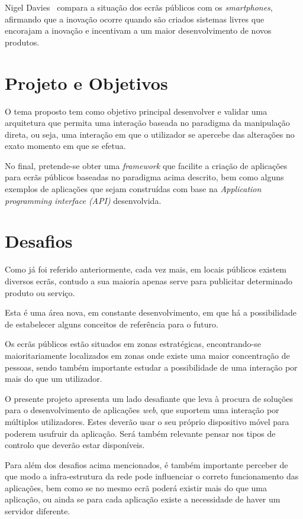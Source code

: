 Nigel Davies~\cite{Davies2012b} compara a situação dos ecrãs públicos com os \textit{smartphones}, afirmando que a inovação ocorre quando são criados sistemas livres que encorajam a inovação e incentivam a um maior desenvolvimento de novos produtos.

\section{Projeto e Objetivos} \label{sec:proj}

O tema proposto tem como objetivo principal desenvolver e validar uma arquitetura que permita uma interação baseada no paradigma da manipulação direta, ou seja, uma interação em que o utilizador se apercebe das alterações no exato momento em que se efetua.

No final, pretende-se obter uma \textit{framework} que facilite a criação de aplicações para ecrãs públicos baseadas no paradigma acima descrito, bem como alguns exemplos de aplicações que sejam construídas com base na \textit{Application programming interface (API)} desenvolvida.

\section{Desafios} \label{sec:goals}

Como já foi referido anteriormente, cada vez mais, em locais públicos existem diversos ecrãs, contudo a sua maioria apenas serve para publicitar determinado produto ou serviço. 

Esta é uma área nova, em constante desenvolvimento, em que há a possibilidade de estabelecer alguns conceitos de referência para o futuro.

Os ecrãs públicos estão situados em zonas estratégicas, encontrando-se maioritariamente localizados em zonas onde existe uma maior concentração de pessoas, sendo também importante estudar a possibilidade de uma interação por mais do que um utilizador.

O presente projeto apresenta um lado desafiante que leva à procura de soluções para o desenvolvimento de aplicações \textit{web}, que suportem uma interação por múltiplos utilizadores. Estes deverão usar o seu próprio dispositivo móvel para poderem usufruir da aplicação.  
Será também relevante pensar nos tipos de controlo que deverão estar disponíveis. 

Para além dos desafios acima mencionados, é também importante perceber de que modo a infra-estrutura da rede pode influenciar o correto funcionamento das aplicações, bem como se no mesmo ecrã poderá existir mais do que uma aplicação, ou ainda se para cada aplicação existe a necessidade de haver um servidor diferente. 

